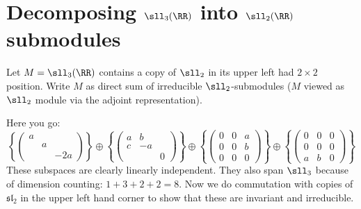 \documentclass[11pt, headheight=30pt]{scrartcl}
\begin{document}
\section{Decomposing $\sll_3(\RR)$ into $\sll_2(\RR)$ submodules}
\begin{prob}
    Let $M = \sll_3(\RR)$ contains a copy of $\sll_2$ in its upper left had $2 \times 2$ position. Write
    $M$ as direct sum of irreducible $\sll_2$-submodules ($M$ viewed as $\sll_2$ module via the adjoint
    representation).
\end{prob}
Here you go:
\[ 
\left\{\begin{pmatrix}
    a &  & \\
     & a & \\
    & & -2a
\end{pmatrix}\right\}
\oplus
\left\{\begin{pmatrix}
    a & b & \\
    c & -a & \\
    & & 0
\end{pmatrix}\right\}
\oplus
\left\{\begin{pmatrix}
    0 & 0 & a\\
    0 & 0 & b\\
    0 & 0 & 0
\end{pmatrix}\right\}
\oplus
\left\{\begin{pmatrix}
    0 & 0 & 0\\
    0 & 0 & 0\\
    a & b & 0
\end{pmatrix}\right\}
\]
These subspaces are clearly linearly independent. They also
span $\sll_3$ because of dimension counting: $1 + 3 + 2 + 2 = 8$.
Now we do commutation with copies of $\mathfrak{sl}_2$
in the upper left hand corner to show that these are invariant
and irreducible.
\end{document}
